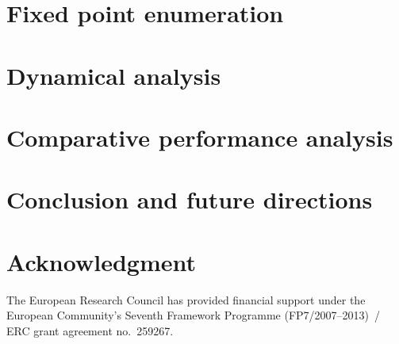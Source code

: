 \documentclass[conference]{IEEEtran}
\begin{document}
\section{Fixed point enumeration}
\label{sec:fixpoint}


\section{Dynamical analysis}
\label{sec:dynamics}


\section{Comparative performance analysis}
\label{sec:comparison}



\section{Conclusion and future directions}
\label{sec:ccl}








\section*{Acknowledgment}

The European Research Council has provided financial support
under the European Community's Seventh Framework Programme (FP7/2007--2013)~/
ERC grant agreement no.~259267.




\end{document}
